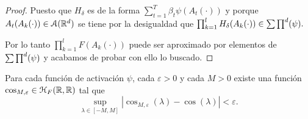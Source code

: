 \begin{proof}
    Puesto que $H_\delta$ es de la forma  $\sum_{t=1}^T \beta_t \psi(A_t(\cdot))$ 
    y porque $A_t(A_k(\cdot)) \in \mathcal{A}(\mathbb{R}^d)$ se tiene por la desigualdad  que 
    $\prod ^l_{k=1} H_\delta(A_k(\cdot)) \in \sum \prod^d (\psi).$

    Por lo tanto $\prod ^l_{k=1} F(A_k(\cdot))$ puede ser 
    aproximado por elementos de $\sum \prod^d (\psi)$ y acabamos de probar con ello lo buscado. 
\end{proof} 

\begin{lema}\label{lema:A_3_función_activación_continua_con_arbitaria}
    Para cada función de activación $\psi$, cada $\varepsilon >0$
    y cada $M>0$ existe una función 
    $\cos_{M,\varepsilon} \in \mathcal{H}_F{(\mathbb{R}, \mathbb{R})}$ tal que 
    \begin{equation}
        \sup_{ \lambda \in [-M, M]}
        |\cos_{M,\varepsilon}(\lambda) - \cos(\lambda)|
        < 
        \varepsilon. 
    \end{equation}
\end{lema}
